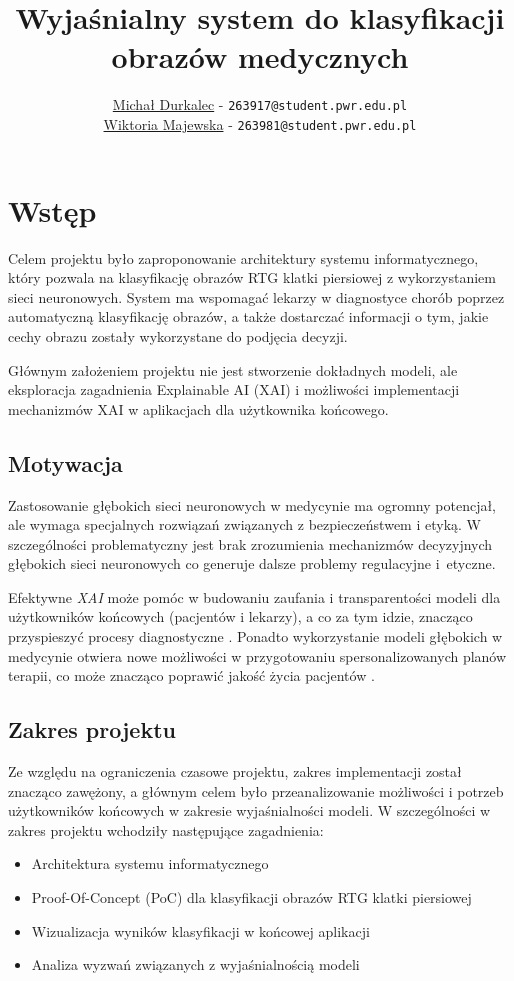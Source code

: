 \documentclass{article}
\title{Wyjaśnialny system do klasyfikacji obrazów medycznych}
\author{\href{mailto:263917@student.pwr.edu.pl}{Michał Durkalec} - \texttt{263917@student.pwr.edu.pl}\\ 
        \href{mailto:263981@student.pwr.edu.pl}{Wiktoria Majewska} - \texttt{263981@student.pwr.edu.pl}}
\date{\vspace{-5ex}} %
\begin{document}
\maketitle
\thispagestyle{firstpage}
\pagestyle{firstpage}

\section{Wstęp}
Celem projektu było zaproponowanie architektury systemu informatycznego, który pozwala na klasyfikację obrazów RTG klatki piersiowej z wykorzystaniem sieci neuronowych.
System ma wspomagać lekarzy w diagnostyce chorób poprzez automatyczną klasyfikację obrazów, a także dostarczać informacji o tym, jakie cechy obrazu zostały wykorzystane do podjęcia decyzji.

Głównym założeniem projektu nie jest stworzenie dokładnych modeli, ale eksploracja zagadnienia Explainable AI (XAI) \cite{gunning2019xai,barredoarrieta2020explainable} i możliwości implementacji mechanizmów XAI w aplikacjach dla użytkownika końcowego.

\subsection{Motywacja}
Zastosowanie głębokich sieci neuronowych w medycynie ma ogromny potencjał, ale wymaga specjalnych rozwiązań związanych z bezpieczeństwem i etyką.
W szczególności problematyczny jest brak zrozumienia mechanizmów decyzyjnych głębokich sieci neuronowych co generuje dalsze problemy regulacyjne i~etyczne. \cite{challen2019artificial}

Efektywne \emph{XAI} może pomóc w budowaniu zaufania i transparentości modeli dla użytkowników końcowych (pacjentów i lekarzy),
a co za tym idzie, znacząco przyspieszyć procesy diagnostyczne \cite{amann2020explainability}.
Ponadto wykorzystanie modeli głębokich w medycynie otwiera nowe możliwości w przygotowaniu spersonalizowanych planów terapii,
co może znacząco poprawić jakość życia pacjentów \cite{allen2024promise}.

\subsection{Zakres projektu}
Ze względu na ograniczenia czasowe projektu, zakres implementacji został znacząco zawężony, a głównym celem było przeanalizowanie możliwości i potrzeb użytkowników końcowych w zakresie wyjaśnialności modeli.
W szczególności w zakres projektu wchodziły następujące zagadnienia:
\begin{itemize}
  \item Architektura systemu informatycznego
  \item Proof-Of-Concept (PoC) dla klasyfikacji obrazów RTG klatki piersiowej
  \item Wizualizacja wyników klasyfikacji w końcowej aplikacji
  \item Analiza wyzwań związanych z wyjaśnialnością modeli
\end{itemize}
\end{document}
